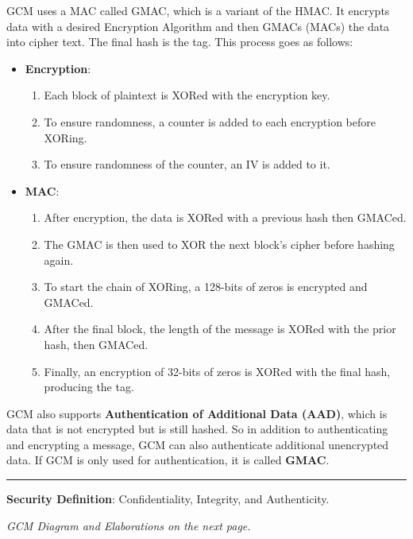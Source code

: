 \begin{Def}

    \label{theo:gcm}
    GCM uses a MAC called GMAC, which is a variant of the HMAC. It encrypts data 
    with a desired Encryption Algorithm and then GMACs (MACs) the data into cipher text. The final hash is the tag. This 
    process goes as follows:
    \begin{itemize}
        \item \textbf{Encryption}:
        \begin{enumerate}
            \item Each block of plaintext is XORed with the encryption key.
            \item To ensure randomness, a counter is added to each encryption before XORing.
            \item To ensure randomness of the counter, an IV is added to it.
        \end{enumerate}
        \item \textbf{MAC}:
        \begin{enumerate}
            \item After encryption, the data is XORed with a previous hash then GMACed.
            \item The GMAC is then used to XOR the next block's cipher before hashing again.
            \item To start the chain of XORing, a 128-bits of zeros is encrypted and GMACed.
            \item After the final block, the length of the message is XORed with the prior hash, then GMACed.
            \item Finally, an encryption of 32-bits of zeros is XORed with the final hash, producing the tag.
        \end{enumerate}
    \end{itemize}

    \noindent
    GCM also supports \textbf{Authentication of Additional Data (AAD)}, which is data that is not encrypted but is still hashed.
    So in addition to authenticating and encrypting a message, GCM can also authenticate additional unencrypted data.
    If GCM is only used for authentication, it is called \textbf{GMAC}. \hfill \cite{vidder_gcm_gmac}
    \noindent
    \rule{\textwidth}{0.4pt}
    \textbf{Security Definition}: Confidentiality, Integrity, and Authenticity.
\end{Def}

\vfill
\begin{center}
    \textit{GCM Diagram and Elaborations on the next page.}
\end{center}
\vfill 

